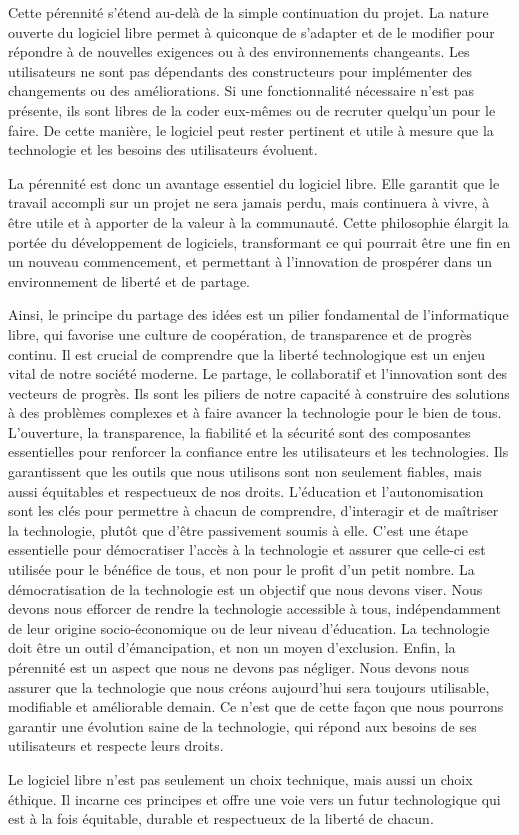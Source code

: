Cette pérennité s'étend au-delà de la simple continuation du projet. La nature ouverte du logiciel libre permet à quiconque de s'adapter et de le modifier pour répondre à de nouvelles exigences ou à des environnements changeants. Les utilisateurs ne sont pas dépendants des constructeurs pour implémenter des changements ou des améliorations. Si une fonctionnalité nécessaire n'est pas présente, ils sont libres de la coder eux-mêmes ou de recruter quelqu'un pour le faire. De cette manière, le logiciel peut rester pertinent et utile à mesure que la technologie et les besoins des utilisateurs évoluent.

La pérennité est donc un avantage essentiel du logiciel libre. Elle garantit que le travail accompli sur un projet ne sera jamais perdu, mais continuera à vivre, à être utile et à apporter de la valeur à la communauté. Cette philosophie élargit la portée du développement de logiciels, transformant ce qui pourrait être une fin en un nouveau commencement, et permettant à l'innovation de prospérer dans un environnement de liberté et de partage.



Ainsi, le principe du partage des idées est un pilier fondamental de l'informatique libre, qui favorise une culture de coopération, de transparence et de progrès continu.
Il est crucial de comprendre que la liberté technologique est un enjeu vital de notre société moderne. Le partage, le collaboratif et l'innovation sont des vecteurs de progrès. Ils sont les piliers de notre capacité à construire des solutions à des problèmes complexes et à faire avancer la technologie pour le bien de tous.
L'ouverture, la transparence, la fiabilité et la sécurité sont des composantes essentielles pour renforcer la confiance entre les utilisateurs et les technologies. Ils garantissent que les outils que nous utilisons sont non seulement fiables, mais aussi équitables et respectueux de nos droits.
L'éducation et l'autonomisation sont les clés pour permettre à chacun de comprendre, d'interagir et de maîtriser la technologie, plutôt que d'être passivement soumis à elle. C'est une étape essentielle pour démocratiser l'accès à la technologie et assurer que celle-ci est utilisée pour le bénéfice de tous, et non pour le profit d'un petit nombre.
La démocratisation de la technologie est un objectif que nous devons viser. Nous devons nous efforcer de rendre la technologie accessible à tous, indépendamment de leur origine socio-économique ou de leur niveau d'éducation. La technologie doit être un outil d'émancipation, et non un moyen d'exclusion.
Enfin, la pérennité est un aspect que nous ne devons pas négliger. Nous devons nous assurer que la technologie que nous créons aujourd'hui sera toujours utilisable, modifiable et améliorable demain. Ce n'est que de cette façon que nous pourrons garantir une évolution saine de la technologie, qui répond aux besoins de ses utilisateurs et respecte leurs droits.

Le logiciel libre n'est pas seulement un choix technique, mais aussi un choix éthique. Il incarne ces principes et offre une voie vers un futur technologique qui est à la fois équitable, durable et respectueux de la liberté de chacun.

